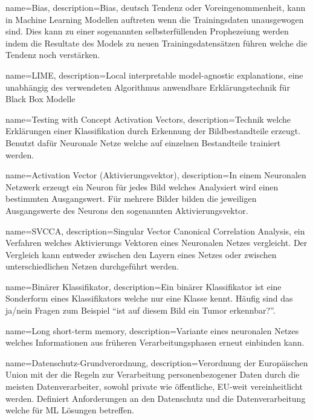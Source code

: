 {
	name=Bias,
	description={Bias, deutsch Tendenz oder Voreingenommenheit, kann in Machine Learning Modellen auftreten wenn die Trainingsdaten unausgewogen sind. Dies kann zu einer sogenannten selbsterfüllenden Prophezeiung werden indem die Resultate des Models zu neuen Trainingsdatensätzen führen welche die Tendenz noch verstärken.}  
}

{
	name=LIME,
	description={Local interpretable model-agnostic explanations, eine unabhängig des verwendeten Algorithmus anwendbare Erklärungstechnik für Black Box Modelle }
}

{
	name=Testing with Concept Activation Vectors,
	description={Technik welche Erklärungen einer Klassifikation durch Erkennung der Bildbestandteile erzeugt. Benutzt dafür Neuronale Netze welche auf einzelnen Bestandteile trainiert werden. \parencite{Kim2017}}
}

{
	name=Activation Vector (Aktivierungsvektor),
	description={In einem Neuronalen Netzwerk erzeugt ein Neuron für jedes Bild welches Analysiert wird einen bestimmten Ausgangswert. Für mehrere Bilder bilden die jeweiligen Ausgangswerte des Neurons den sogenannten Aktivierungsvektor.}
}

{
	name=SVCCA,
     description={Singular Vector Canonical Correlation Analysis, ein Verfahren welches Aktivierungs Vektoren eines Neuronalen Netzes vergleicht. Der Vergleich kann entweder zwischen den Layern eines Netzes oder zwischen unterschiedlichen Netzen durchgeführt werden. \parencite{Raghu2017}}
}

{
	name=Binärer Klassifikator,
     description={Ein binärer Klassifikator ist eine Sonderform eines Klassifikators welche nur eine Klasse kennt. Häufig sind das ja/nein Fragen zum Beispiel ``ist auf diesem Bild ein Tumor erkennbar?''.}
}

{
	name=Long short-term memory,
     description={Variante eines neuronalen Netzes welches Informationen aus früheren Verarbeitungsphasen erneut einbinden kann.}
}

{
	name=Datenschutz-Grundverordnung,
     description={Verordnung der Europäischen Union mit der die Regeln zur Verarbeitung personenbezogener Daten durch die meisten Datenverarbeiter, sowohl private wie öffentliche, EU-weit vereinheitlicht werden. Definiert Anforderungen an den Datenschutz und die Datenverarbeitung welche für \Gls{ML} Lösungen betreffen.}
}

